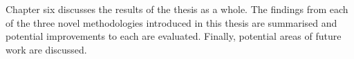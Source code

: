Chapter six discusses the results of the thesis as a whole. The findings from each of the three novel methodologies introduced in this thesis are summarised and potential improvements to each are evaluated. Finally, potential areas of future work are discussed.



